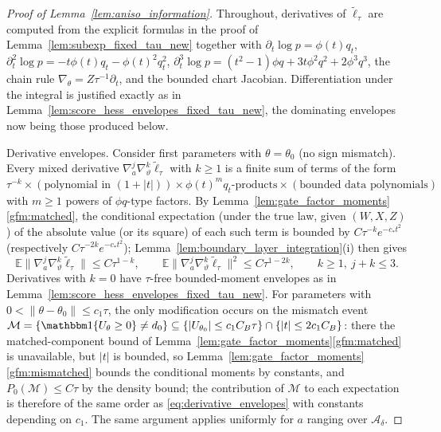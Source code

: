 \documentclass[10pt,a4paper]{amsart}
\newcommand{\E}{\mathbb{E}}
\begin{document}
\begin{proof}[Proof of Lemma~\ref{lem:aniso_information}]
Throughout, derivatives of $\tilde\ell_\tau$ are computed from the explicit formulas in the proof of Lemma~\ref{lem:subexp_fixed_tau_new} together with $\partial_t\log p=\phi(t)q_t$, $\partial^2_t\log p=-t\phi(t)q_t-\phi(t)^2q_t^2$, $\partial^3_t\log p=(t^2-1)\phi q+3t\phi^2q^2+2\phi^3q^3$, the chain rule $\nabla_\theta=Z\tau^{-1}\partial_t$, and the bounded chart Jacobian. Differentiation under the integral is justified exactly as in Lemma~\ref{lem:score_hess_envelopes_fixed_tau_new}, the dominating envelopes now being those produced below.

Derivative envelopes. Consider first parameters with $\theta=\theta_0$ (no sign mismatch). Every mixed derivative $\nabla^j_a\nabla^k_\vartheta\tilde\ell_\tau$ with $k\ge1$ is a finite sum of terms of the form
$\tau^{-k}\times(\text{polynomial in }(1+|t|))\times\phi(t)^m q_t\text{-products}\times(\text{bounded data polynomials})$
with $m\ge1$ powers of $\phi q$-type factors. By Lemma~\ref{lem:gate_factor_moments}\ref{gfm:matched}, the conditional expectation (under the true law, given $(W,X,Z)$) of the absolute value (or its square) of each such term is bounded by $C\tau^{-k}e^{-c_*t^2}$ (respectively $C\tau^{-2k}e^{-c_*t^2}$); Lemma~\ref{lem:boundary_layer_integration}(i) then gives
\begin{equation}
\E\big\|\nabla^j_a\nabla^k_\vartheta\tilde\ell_\tau\big\|\le C\tau^{1-k},
\qquad
\E\big\|\nabla^j_a\nabla^k_\vartheta\tilde\ell_\tau\big\|^2\le C\tau^{1-2k},
\qquad k\ge1,\ j+k\le3 .
\label{eq:derivative_envelopes}
\end{equation}
Derivatives with $k=0$ have $\tau$-free bounded-moment envelopes as in Lemma~\ref{lem:score_hess_envelopes_fixed_tau_new}. For parameters with $0<\|\theta-\theta_0\|\le c_1\tau$, the only modification occurs on the mismatch event
$\mathcal M=\{\mathbbm 1\{U_\theta\ge0\}\neq d_0\}\subseteq\{|U_{\theta_0}|\le c_1C_B\tau\}\cap\{|t|\le2c_1C_B\}$:
there the matched-component bound of Lemma~\ref{lem:gate_factor_moments}\ref{gfm:matched} is unavailable, but $|t|$ is bounded, so Lemma~\ref{lem:gate_factor_moments}\ref{gfm:mismatched} bounds the conditional moments by constants, and $P_0(\mathcal M)\le C\tau$ by the density bound; the contribution of $\mathcal M$ to each expectation is therefore of the same order as \eqref{eq:derivative_envelopes} with constants depending on $c_1$. The same argument applies uniformly for $a$ ranging over $\mathcal A_\delta$.


\end{proof}
\end{document}
